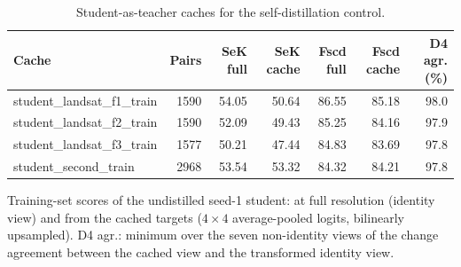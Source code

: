 \begin{table}[!t]
\centering
\footnotesize
\caption{Student-as-teacher caches for the self-distillation control.}
\label{tab:s-controls-caches}
\begin{tabular}{lrrrrrr}
\toprule
Cache & Pairs & SeK full & SeK cache & Fscd full & Fscd cache & D4 agr. (\%) \\
\midrule
student\_landsat\_f1\_train & 1590 & 54.05 & 50.64 & 86.55 & 85.18 & 98.0 \\
student\_landsat\_f2\_train & 1590 & 52.09 & 49.43 & 85.25 & 84.16 & 97.9 \\
student\_landsat\_f3\_train & 1577 & 50.21 & 47.44 & 84.83 & 83.69 & 97.8 \\
student\_second\_train & 2968 & 53.54 & 53.32 & 84.32 & 84.21 & 97.8 \\
\bottomrule
\end{tabular}
\par\smallskip\parbox{\linewidth}{\scriptsize Training-set scores of the undistilled seed-1 student: at full resolution (identity view) and from the cached targets ($4\times4$ average-pooled logits, bilinearly upsampled). D4 agr.: minimum over the seven non-identity views of the change agreement between the cached view and the transformed identity view.}
\end{table}
